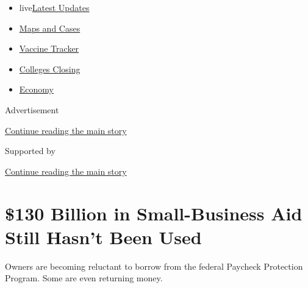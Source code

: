 \begin{itemize}
\tightlist
\item
  live\href{https://www.nytimes3xbfgragh.onion/2020/08/20/world/coronavirus-covid.html?name=styln-coronavirus-markets\&region=TOP_BANNER\&variant=undefined\&block=storyline_menu_recirc\&action=click\&pgtype=Article\&impression_id=9f77a221-e383-11ea-a48e-b9252519409f}{Latest
  Updates}
\item
  \href{https://www.nytimes3xbfgragh.onion/interactive/2020/us/coronavirus-us-cases.html?name=styln-coronavirus-markets\&region=TOP_BANNER\&variant=undefined\&block=storyline_menu_recirc\&action=click\&pgtype=Article\&impression_id=9f77a222-e383-11ea-a48e-b9252519409f}{Maps
  and Cases}
\item
  \href{https://www.nytimes3xbfgragh.onion/interactive/2020/science/coronavirus-vaccine-tracker.html?name=styln-coronavirus-markets\&region=TOP_BANNER\&variant=undefined\&block=storyline_menu_recirc\&action=click\&pgtype=Article\&impression_id=9f77a223-e383-11ea-a48e-b9252519409f}{Vaccine
  Tracker}
\item
  \href{https://www.nytimes3xbfgragh.onion/2020/08/19/us/colleges-closing-covid.html?name=styln-coronavirus-markets\&region=TOP_BANNER\&variant=undefined\&block=storyline_menu_recirc\&action=click\&pgtype=Article\&impression_id=9f77a224-e383-11ea-a48e-b9252519409f}{Colleges
  Closing}
\item
  \href{https://www.nytimes3xbfgragh.onion/live/2020/08/20/business/stock-market-today-coronavirus?name=styln-coronavirus-markets\&region=TOP_BANNER\&variant=undefined\&block=storyline_menu_recirc\&action=click\&pgtype=Article\&impression_id=9f77a225-e383-11ea-a48e-b9252519409f}{Economy}
\end{itemize}

Advertisement

\protect\hyperlink{after-top}{Continue reading the main story}

Supported by

\protect\hyperlink{after-sponsor}{Continue reading the main story}

\hypertarget{130-billion-in-small-business-aid-still-hasnt-been-used}{%
\section{\$130 Billion in Small-Business Aid Still Hasn't Been
Used}\label{130-billion-in-small-business-aid-still-hasnt-been-used}}

Owners are becoming reluctant to borrow from the federal Paycheck
Protection Program. Some are even returning money.

